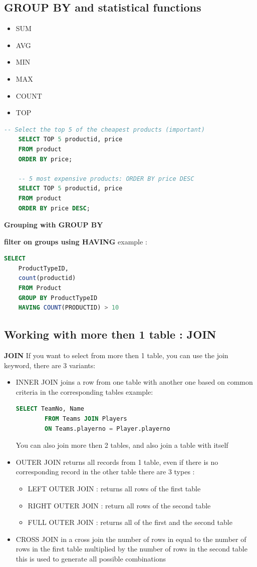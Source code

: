\documentclass{report}
\begin{document}
	\subsection{GROUP BY and statistical functions}
	\begin{itemize}
		\item SUM
		\item AVG
		\item MIN 
		\item MAX
		\item COUNT
		\item TOP
	\end{itemize}
	
	\begin{lstlisting}[language=SQL]
	-- Select the top 5 of the cheapest products (important)
	SELECT TOP 5 productid, price
	FROM product
	ORDER BY price;
	
	-- 5 most expensive products: ORDER BY price DESC
	SELECT TOP 5 productid, price
	FROM product
	ORDER BY price DESC;
	\end{lstlisting}
	
	\textbf{Grouping with GROUP BY}
	
	\textbf{filter on groups using HAVING}
	example : 
	\begin{lstlisting}[language=SQL]
	SELECT
	ProductTypeID,
	count(productid)
	FROM Product
	GROUP BY ProductTypeID
	HAVING COUNT(PRODUCTID) > 10\end{lstlisting}
	\subsection{Working with more then 1 table : JOIN}
	\textbf{JOIN}
	If you want to select from more then 1 table, you can use the join keyword, there are 3 variants: 
	\begin{itemize}
		\item INNER JOIN
		\subitem joins a row from one table with another one based on common criteria in the corresponding tables
		example: 
		\begin{lstlisting}[language=SQL]
		SELECT TeamNo, Name
		FROM Teams JOIN Players
		ON Teams.playerno = Player.playerno\end{lstlisting}
		\subitem You can also join more then 2 tables, and also join a table with itself
		\item OUTER JOIN
		\subitem returns all records from 1 table, even if there is no corresponding record in the other table
		\subitem there are 3 types : 
		\begin{itemize}
			\item LEFT OUTER JOIN : returns all rows of the first table
			\item RIGHT OUTER JOIN  : return all rows of the second table
			\item FULL OUTER JOIN  : returns all of the first and the second table 
		\end{itemize}
		\item CROSS JOIN 
		\subitem in a cross join the number of rows in equal to the number of rows in the first table multiplied by the number of rows in the second table
		\subitem this is used to generate all possible combinations
	\end{itemize}
\end{document}
